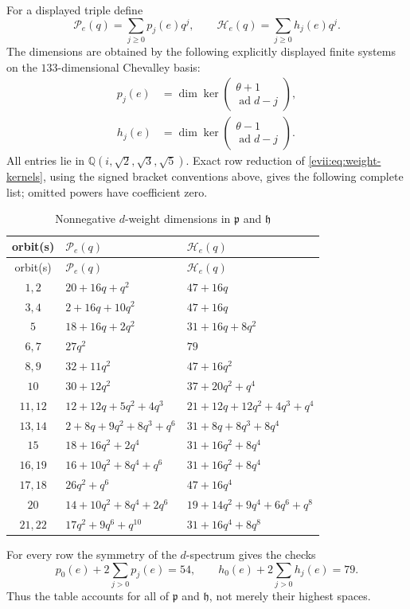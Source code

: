 \documentclass[11pt,reqno]{amsart}
\numberwithin{equation}{section}
\theoremstyle{definition}
\theoremstyle{remark}
\newcommand{\Q}{\mathbb Q}
\newcommand{\ad}{\operatorname{ad}}
\newcommand{\fh}{\mathfrak h}
\newcommand{\fp}{\mathfrak p}
\begin{document}
For a displayed triple define
\[
 \mathcal P_e(q)=\sum_{j\geq0}p_j(e)q^j,
 \qquad
 \mathcal H_e(q)=\sum_{j\geq0}h_j(e)q^j.
\]
The dimensions are obtained by the following explicitly displayed finite
systems on the $133$-dimensional Chevalley basis:
\begin{equation}\label{evii:eq:weight-kernels}
\begin{aligned}
 p_j(e)&=\dim\ker
 \begin{pmatrix}\theta+1\\ \ad d-j\end{pmatrix},\\
 h_j(e)&=\dim\ker
 \begin{pmatrix}\theta-1\\ \ad d-j\end{pmatrix}.
\end{aligned}
\end{equation}
All entries lie in $\Q(i,\sqrt2,\sqrt3,\sqrt5)$.  Exact row reduction of
\eqref{evii:eq:weight-kernels}, using the signed bracket conventions above,
gives the following complete list; omitted powers have coefficient zero.

\begingroup
\small
\renewcommand{\arraystretch}{1.08}
\begin{longtable}{@{}c >{\raggedright\arraybackslash}p{}
 >{\raggedright\arraybackslash}p{}@{}}
\caption{Nonnegative $d$-weight dimensions in $\fp$ and $\fh$}
\label{evii:tab:weight-dimensions}\\
\toprule
orbit(s)&$\mathcal P_e(q)$&$\mathcal H_e(q)$\\
\midrule
\endfirsthead
\toprule
orbit(s)&$\mathcal P_e(q)$&$\mathcal H_e(q)$\\
\midrule
\endhead
$1,2$   &$20+16q+q^2$&$47+16q$\\
$3,4$   &$2+16q+10q^2$&$47+16q$\\
$5$     &$18+16q+2q^2$&$31+16q+8q^2$\\
$6,7$   &$27q^2$&$79$\\
$8,9$   &$32+11q^2$&$47+16q^2$\\
$10$    &$30+12q^2$&$37+20q^2+q^4$\\
$11,12$ &$12+12q+5q^2+4q^3$&$21+12q+12q^2+4q^3+q^4$\\
$13,14$ &$2+8q+9q^2+8q^3+q^6$&$31+8q+8q^3+8q^4$\\
$15$    &$18+16q^2+2q^4$&$31+16q^2+8q^4$\\
$16,19$ &$16+10q^2+8q^4+q^6$&$31+16q^2+8q^4$\\
$17,18$ &$26q^2+q^6$&$47+16q^4$\\
$20$    &$14+10q^2+8q^4+2q^6$&$19+14q^2+9q^4+6q^6+q^8$\\
$21,22$ &$17q^2+9q^6+q^{10}$&$31+16q^4+8q^8$\\
\bottomrule
\end{longtable}
\endgroup
For every row the symmetry of the $d$-spectrum gives the checks
\[
 p_0(e)+2\sum_{j>0}p_j(e)=54,
 \qquad
 h_0(e)+2\sum_{j>0}h_j(e)=79.
\]
Thus the table accounts for all of $\fp$ and $\fh$, not merely their
highest spaces.
\end{document}
